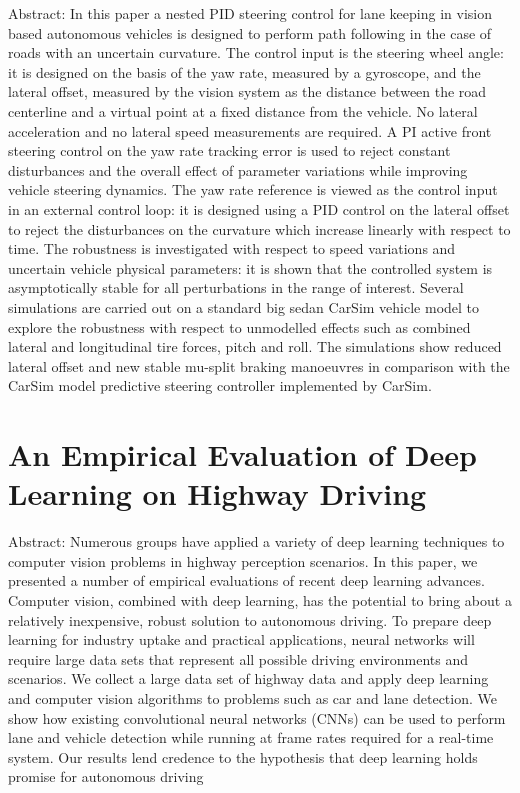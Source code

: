 \documentclass[letterpaper, 10 pt, conference]{ieeeconf}  %
\begin{document}
Abstract:
    In this paper a nested PID steering control for lane keeping in vision based autonomous vehicles is designed to perform path following in the case of roads with an uncertain curvature. The control input is the steering wheel angle: it is designed on the basis of the yaw rate, measured by a gyroscope, and the lateral offset, measured by the vision system as the distance between the road centerline and a virtual point at a fixed distance from the vehicle. No lateral acceleration and no lateral speed measurements are required. A PI active front steering control on the yaw rate tracking error is used to reject constant disturbances and the overall effect of parameter variations while improving vehicle steering dynamics. The yaw rate reference is viewed as the control input in an external control loop: it is designed using a PID control on the lateral offset to reject the disturbances on the curvature which increase linearly with respect to time. The robustness is investigated with respect to speed variations and uncertain vehicle physical parameters: it is shown that the controlled system is asymptotically stable for all perturbations in the range of interest. Several simulations are carried out on a standard big sedan CarSim vehicle model to explore the robustness with respect to unmodelled effects such as combined lateral and longitudinal tire forces, pitch and roll. The simulations show reduced lateral offset and new stable mu-split braking manoeuvres in comparison with the CarSim model predictive steering controller implemented by CarSim.\cite{5160343}

\section{An Empirical Evaluation of Deep Learning on Highway Driving}

Abstract:
    Numerous groups have applied a variety of deep learning techniques to computer vision problems in highway perception scenarios. In this paper, we presented a number of empirical evaluations of recent deep learning advances. Computer vision, combined with deep learning, has the potential to bring about a relatively inexpensive, robust solution to autonomous driving. To prepare deep learning for industry uptake and practical applications, neural networks will require large data sets that represent all possible driving environments and scenarios. We collect a large data set of highway data and apply deep learning and computer vision algorithms to problems such as car and lane detection. We show how existing convolutional neural networks (CNNs) can be used to perform lane and vehicle detection while running at frame rates required for a real-time system. Our results lend credence to the hypothesis that deep learning holds promise for autonomous driving\cite{DBLP:journals/corr/HuvalWTKSPARMCM15}
\end{document}
